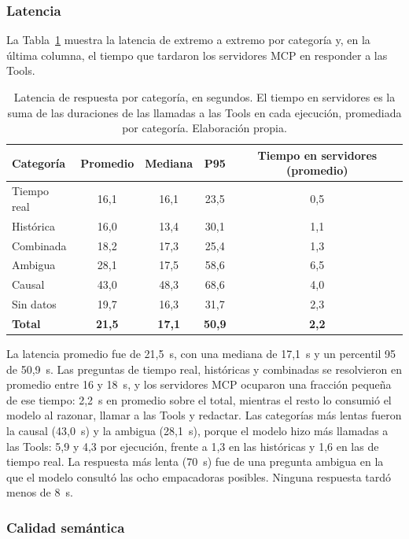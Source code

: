 \subsubsection{Latencia}

La Tabla~\ref{tab:res_latencia} muestra la latencia de extremo a extremo por categoría y, en la última columna, el tiempo que tardaron los servidores MCP en responder a las Tools.

\begin{table}[H]
\centering
\caption{Latencia de respuesta por categoría, en segundos. El tiempo en servidores es la suma de las duraciones de las llamadas a las Tools en cada ejecución, promediada por categoría. Elaboración propia.}
\label{tab:res_latencia}
\small
\renewcommand{\arraystretch}{1.3}
\begin{tabular}{lcccc}
\hline
\textbf{Categoría} & \textbf{Promedio} & \textbf{Mediana} & \textbf{P95} & \textbf{Tiempo en servidores (promedio)} \\
\hline
Tiempo real & 16,1 & 16,1 & 23,5 & 0,5 \\
Histórica & 16,0 & 13,4 & 30,1 & 1,1 \\
Combinada & 18,2 & 17,3 & 25,4 & 1,3 \\
Ambigua & 28,1 & 17,5 & 58,6 & 6,5 \\
Causal & 43,0 & 48,3 & 68,6 & 4,0 \\
Sin datos & 19,7 & 16,3 & 31,7 & 2,3 \\
\hline
\textbf{Total} & \textbf{21,5} & \textbf{17,1} & \textbf{50,9} & \textbf{2,2} \\
\hline
\end{tabular}
\end{table}

La latencia promedio fue de 21,5~s, con una mediana de 17,1~s y un percentil 95 de 50,9~s. Las preguntas de tiempo real, históricas y combinadas se resolvieron en promedio entre 16 y 18~s, y los servidores MCP ocuparon una fracción pequeña de ese tiempo: 2,2~s en promedio sobre el total, mientras el resto lo consumió el modelo al razonar, llamar a las Tools y redactar. Las categorías más lentas fueron la causal (43,0~s) y la ambigua (28,1~s), porque el modelo hizo más llamadas a las Tools: 5,9 y 4,3 por ejecución, frente a 1,3 en las históricas y 1,6 en las de tiempo real. La respuesta más lenta (70~s) fue de una pregunta ambigua en la que el modelo consultó las ocho empacadoras posibles. Ninguna respuesta tardó menos de 8~s.

\subsubsection{Calidad semántica}

